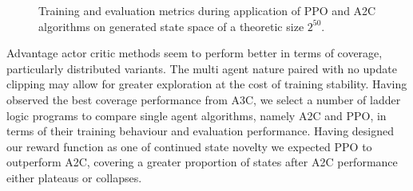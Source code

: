 \documentclass[runningheads]{llncs}
\begin{document}
\begin{figure}[h]
	\centering
	\hfil
	\caption{Training and evaluation metrics during application of PPO and A2C algorithms on generated state space of a theoretic size $2^{50}$.}
	\label{fig:performance}
\end{figure}

Advantage actor critic methods seem to perform better in terms of coverage, particularly  distributed variants. The multi agent nature paired with no update clipping may allow for greater exploration at the cost of training stability. Having observed the best coverage performance from A3C, we select a number of ladder logic programs to compare single agent algorithms, namely A2C and PPO, in terms of their training behaviour and evaluation performance. Having designed our reward function as one of continued state novelty we expected PPO to outperform A2C, covering a greater proportion of states after A2C performance either plateaus or collapses.
\end{document}
